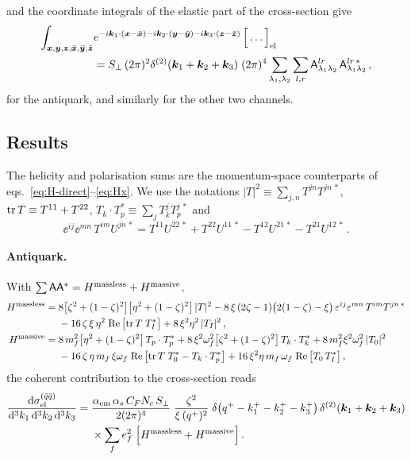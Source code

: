 and the coordinate integrals of the elastic part of the cross-section give
\begin{align}
\int_{\bm{x},\bm{y},\bm{z},\bar{\bm{x}},\bar{\bm{y}},\bar{\bm{z}}}&e^{-i\bm{k}_1\cdot(\bm{x}-\bar{\bm{x}})-i\bm{k}_2\cdot(\bm{y}-\bar{\bm{y}})-i\bm{k}_3\cdot(\bm{z}-\bar{\bm{z}})}\,\Big[\ldots\Big]_{\rm el}
\nonumber\\
&=S_\perp\,(2\pi)^2\delta^{(2)}(\bm{k}_1+\bm{k}_2+\bm{k}_3)\;(2\pi)^4\sum_{\lambda_1,\lambda_2}\sum_{l,r}
\mathsf{A}^{lr}_{\lambda_1\lambda_2}\,\mathsf{A}^{lr\,*}_{\lambda_1\lambda_2}\,,
\label{eq:coordint}
\end{align}
for the antiquark, and similarly for the other two channels.

\subsection{Results}

The helicity and polarisation sums are the momentum-space counterparts of
eqs.~\eqref{eq:H-direct}--\eqref{eq:Hx}. We use the notations
$|T|^2\equiv\sum_{j,n}T^{jn}T^{jn\,*}$, ${\rm tr}\,T\equiv T^{11}+T^{22}$,
$T_k\cdot T_p^*\equiv\sum_jT_k^jT_p^{j\,*}$ and
\begin{equation}
\ee^{ij}\ee^{mn}\,T^{im}U^{jn\,*}=T^{11}U^{22\,*}+T^{22}U^{11\,*}-T^{12}U^{21\,*}-T^{21}U^{12\,*}\,.
\end{equation}

\paragraph{Antiquark.} With $\sum\mathsf{A}\mathsf{A}^*=H^{\rm massless}+H^{\rm massive}$,
\begin{align}
H^{\rm massless}={}&8\big[\zeta^2+(1-\zeta)^2\big]\big[\eta^2+(1-\zeta)^2\big]\,|T|^2
-8\,\xi\,(2\zeta-1)\big(2(1-\zeta)-\xi\big)\,\varepsilon^{ij}\varepsilon^{mn}\,T^{im}T^{jn\,*}
\nonumber\\
&-16\,\zeta\,\xi\,\eta^2\;{\rm Re}\,\big[{\rm tr}\,T\;T_I^*\big]+8\,\xi^2\eta^2\,|T_I|^2\,,
\nonumber\\
H^{\rm massive}={}&8\,m_f^2\big[\eta^2+(1-\zeta)^2\big]\,T_p\cdot T_p^*
+8\,\xi^2\omega_f^2\big[\zeta^2+(1-\zeta)^2\big]\,T_k\cdot T_k^*+8\,m_f^2\xi^2\omega_f^2\,|T_0|^2
\nonumber\\
&-16\,\zeta\,\eta\,m_f\,\xi\omega_f\;{\rm Re}\,\big[{\rm tr}\,T\;T_0^*-T_k\cdot T_p^*\big]
+16\,\xi^2\eta\,m_f\,\omega_f\;{\rm Re}\,\big[T_0\,T_I^*\big]\,,
\label{eq:H-el-qbar}
\end{align}
the coherent contribution to the cross-section reads
\begin{align}
\frac{{\rm d}\sigma^{(\bar q\bar q)}_{\rm el}}{{\rm d}^3k_1\,{\rm d}^3k_2\,{\rm d}^3k_3}={}&
\frac{\alpha_{\rm em}\,\alpha_s\,C_FN_c\,S_\perp}{2(2\pi)^{4}}\;\frac{\zeta^2}{\xi\,(q^+)^2}\;
\delta\big(q^+-k_1^+-k_2^+-k_3^+\big)\,\delta^{(2)}(\bm{k}_1+\bm{k}_2+\bm{k}_3)
\nonumber\\
&\times\sum_fe_f^2\;\Big[H^{\rm massless}+H^{\rm massive}\Big]\,.
\label{eq:xs-el-qbar}
\end{align}

